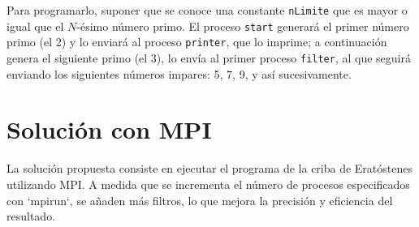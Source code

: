 \documentclass[a4paper,12pt]{article}
\begin{document}
Para programarlo, suponer que se conoce una constante \texttt{nLimite} que es mayor o igual que el \(N\)-ésimo número primo. El proceso \texttt{start} generará el primer número primo (el 2) y lo enviará al proceso \texttt{printer}, que lo imprime; a continuación genera el siguiente primo (el 3), lo envía al primer proceso \texttt{filter}, al que seguirá enviando los siguientes números impares: 5, 7, 9, y así sucesivamente. 


\section{Solución con MPI}

La solución propuesta consiste en ejecutar el programa de la criba de Eratóstenes utilizando MPI. A medida que se incrementa el número de procesos especificados con `mpirun`, se añaden más filtros, lo que mejora la precisión y eficiencia del resultado.







\end{document}
